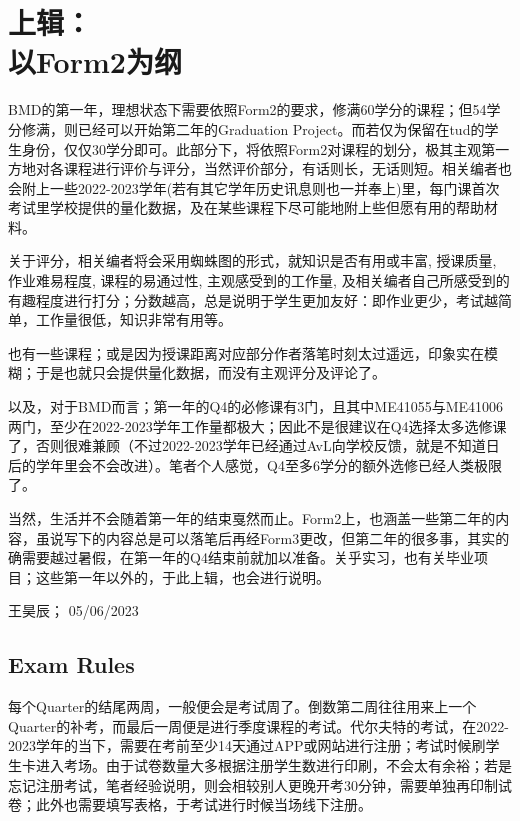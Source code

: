 \chapter[上辑：以Form2为纲]{上辑：\\以Form2为纲}
BMD的第一年，理想状态下需要依照Form2的要求，修满60学分的课程；但54学分修满，则已经可以开始第二年的Graduation Project。而若仅为保留在tud的学生身份，仅仅30学分即可。此部分下，将依照Form2对课程的划分，极其主观第一方地对各课程进行评价与评分，当然评价部分，有话则长，无话则短。相关编者也会附上一些2022-2023学年(若有其它学年历史讯息则也一并奉上)里，每门课首次考试里学校提供的量化数据，及在某些课程下尽可能地附上些但愿有用的帮助材料。

关于评分，相关编者将会采用蜘蛛图的形式，就知识是否有用或丰富, 授课质量, 作业难易程度, 课程的易通过性, 主观感受到的工作量, 及相关编者自己所感受到的有趣程度进行打分；分数越高，总是说明于学生更加友好：即作业更少，考试越简单，工作量很低，知识非常有用等。

也有一些课程；或是因为授课距离对应部分作者落笔时刻太过遥远，印象实在模糊；于是也就只会提供量化数据，而没有主观评分及评论了。

以及，对于BMD而言；第一年的Q4的必修课有3门，且其中ME41055与ME41006两门，至少在2022-2023学年工作量都极大；因此不是很建议在Q4选择太多选修课了，否则很难兼顾（不过2022-2023学年已经通过AvL向学校反馈，就是不知道日后的学年里会不会改进）。笔者个人感觉，Q4至多6学分的额外选修已经人类极限了。

当然，生活并不会随着第一年的结束戛然而止。Form2上，也涵盖一些第二年的内容，虽说写下的内容总是可以落笔后再经Form3更改，但第二年的很多事，其实的确需要越过暑假，在第一年的Q4结束前就加以准备。关乎实习，也有关毕业项目；这些第一年以外的，于此上辑，也会进行说明。
\begin{flushright}
王昊辰； 05/06/2023
\end{flushright}









\vspace{\betsubsec} %
\section{Exam Rules}
每个Quarter的结尾两周，一般便会是考试周了。倒数第二周往往用来上一个Quarter的补考，而最后一周便是进行季度课程的考试。代尔夫特的考试，在2022-2023学年的当下，需要在考前至少14天通过APP或网站进行注册；考试时候刷学生卡进入考场。由于试卷数量大多根据注册学生数进行印刷，不会太有余裕；若是忘记注册考试，笔者经验说明，则会相较别人更晚开考30分钟，需要单独再印制试卷；此外也需要填写表格，于考试进行时候当场线下注册。

